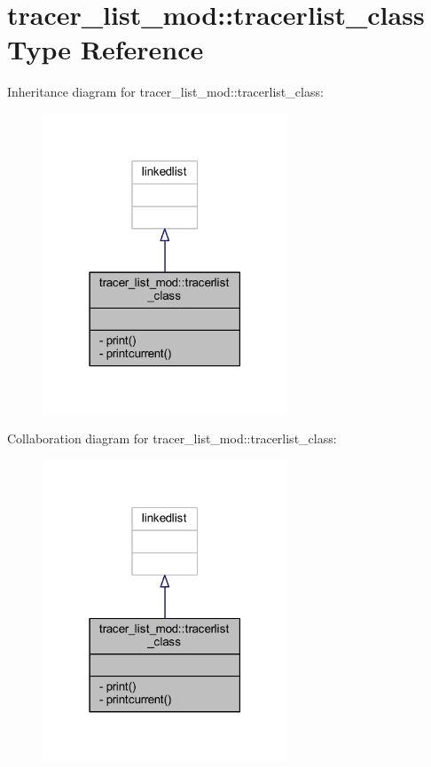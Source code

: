 \hypertarget{structtracer__list__mod_1_1tracerlist__class}{}\section{tracer\+\_\+list\+\_\+mod\+:\+:tracerlist\+\_\+class Type Reference}
\label{structtracer__list__mod_1_1tracerlist__class}


Inheritance diagram for tracer\+\_\+list\+\_\+mod\+:\+:tracerlist\+\_\+class\+:
\nopagebreak
\begin{figure}[H]
\begin{center}
\leavevmode
\includegraphics[width=207pt]{structtracer__list__mod_1_1tracerlist__class__inherit__graph}
\end{center}
\end{figure}


Collaboration diagram for tracer\+\_\+list\+\_\+mod\+:\+:tracerlist\+\_\+class\+:
\nopagebreak
\begin{figure}[H]
\begin{center}
\leavevmode
\includegraphics[width=207pt]{structtracer__list__mod_1_1tracerlist__class__coll__graph}
\end{center}
\end{figure}
